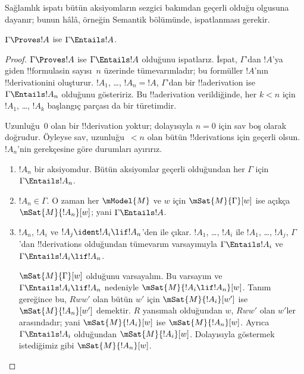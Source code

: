 \documentclass[../../../include/open-logic-section]{subfiles}
\begin{document}


\begin{editorial}
  Sağlamlık ispatı bütün aksiyomların sezgici bakımdan geçerli olduğu
  olgusuna dayanır; bunun hâlâ, örneğin Semantik bölümünde, ispatlanması
  gerekir.
\end{editorial}

\begin{thm}[Sağlamlık]
  $\Gamma \Proves !A$ ise $\Gamma \Entails !A$.
\end{thm}

\begin{proof}
  $\Gamma \Proves !A$ ise $\Gamma \Entails !A$ olduğunu ispatlarız.
  İspat, $\Gamma$'dan $!A$'ya giden !!{formula}s{}in sayısı~$n$ üzerinde
  tümevarımladır; bu formüller $!A$'nın !!{derivation}{}ini oluşturur.
  $!A_1$, \dots, $!A_n=!A$, $\Gamma$'dan bir !!a{derivation} ise
  $\Gamma\Entails !A_n$ olduğunu gösteririz. Bu !!a{derivation} verildiğinde,
  her $k<n$ için $!A_1$, \dots, $!A_k$ başlangıç parçası da bir türetimdir.

  Uzunluğu~$0$ olan bir !!{derivation} yoktur; dolayısıyla $n=0$ için sav
  boş olarak doğrudur. Öyleyse sav, uzunluğu~$<n$ olan bütün !!{derivation}s
  için geçerli olsun. $!A_n$'nin gerekçesine göre durumları ayırırız.

  \begin{enumerate}
  \item $!A_n$ bir aksiyomdur. Bütün aksiyomlar geçerli olduğundan her
    $\Gamma$ için $\Gamma\Entails !A_n$.
  \item $!A_n\in\Gamma$. O zaman her $\mModel{M}$ ve $w$ için
    $\mSat{M}{\Gamma}[w]$ ise açıkça $\mSat{M}{!A_n}[w]$; yani
    $\Gamma\Entails !A$.
  \item $!A_n$, $!A_i$ ve $!A_j\ident !A_i\lif !A_n$'den \MP{} ile
    çıkar. $!A_1$, \dots, $!A_i$ ile $!A_1$, \dots, $!A_j$,
    $\Gamma$'dan !!{derivation}s olduğundan tümevarım varsayımıyla
    $\Gamma\Entails !A_i$ ve $\Gamma\Entails !A_i\lif !A_n$.

    $\mSat{M}{\Gamma}[w]$ olduğunu varsayalım. Bu varsayım ve
    $\Gamma\Entails !A_i\lif !A_n$ nedeniyle
    $\mSat{M}{!A_i\lif !A_n}[w]$. Tanım gereğince bu, $Rww'$ olan bütün
    $w'$ için $\mSat{M}{!A_i}[w']$ ise $\mSat{M}{!A_n}[w']$ demektir.
    $R$ yansımalı olduğundan $w$, $Rww'$ olan $w'$ler arasındadır; yani
    $\mSat{M}{!A_i}[w]$ ise $\mSat{M}{!A_n}[w]$. Ayrıca
    $\Gamma\Entails !A_i$ olduğundan $\mSat{M}{!A_i}[w]$. Dolayısıyla
    göstermek istediğimiz gibi $\mSat{M}{!A_n}[w]$.
  \end{enumerate}
\end{proof}
\end{document}
